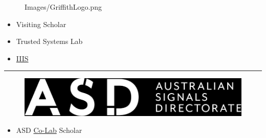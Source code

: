 \documentclass
  [hyperref={colorlinks = true,linkcolor = blue, 
             citecolor = blue, urlcolor = blue}
  ]{beamer}
\begin{document}
\begin{frame}[fragile]
\begin{minipage}{0.5\linewidth}
\begin{figure}[h]
        {Images/GriffithLogo.png}
    \end{figure}
  \end{minipage}
  \hfill
  \begin{minipage}{0.45\linewidth}
  \begin{itemize}
    \item Visiting Scholar
    \item Trusted Systems Lab
    \item \href{https://www.griffith.edu.au/institute-integrated-intelligent-systems}{IIIS}
  \end{itemize}
  \end{minipage}
\hrule
  \begin{minipage}{0.5\linewidth}
    \begin{figure}[h]
      \includegraphics[width=\linewidth]
        {Images/asd-logo.png}
    \end{figure}
  \end{minipage}
  \hfill
  \begin{minipage}{0.45\linewidth}
  \begin{itemize}
    \item ASD 
      \href{https://www.asd.gov.au/about/asd-anu-co-lab}{Co-Lab} 
      Scholar
  \end{itemize}
  \end{minipage}
\end{frame}

% 
\end{document}
